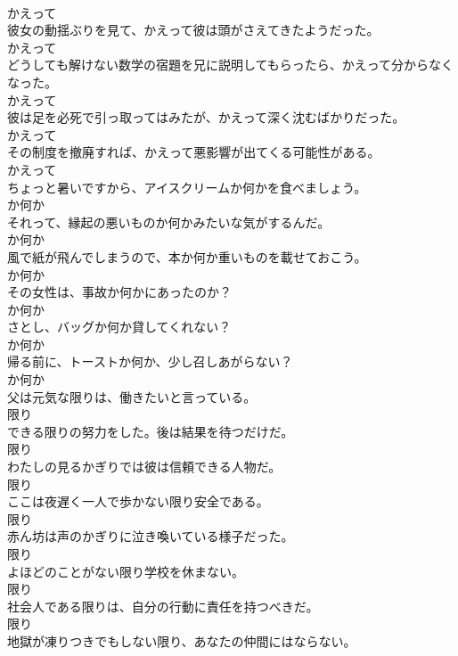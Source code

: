 \documentclass[8pt]{extreport}
\begin{document}
\begin{CJK}{UTF8}{min}
\\	かえって
\\	彼女の動揺ぶりを見て、かえって彼は頭がさえてきたようだった。	
\\	かえって
\\	どうしても解けない数学の宿題を兄に説明してもらったら、かえって分からなくなった。	
\\	かえって
\\	彼は足を必死で引っ取ってはみたが、かえって深く沈むばかりだった。	
\\	かえって
\\	その制度を撤廃すれば、かえって悪影響が出てくる可能性がある。	
\\	かえって
\\	ちょっと暑いですから、アイスクリームか何かを食べましょう。	
\\	か何か
\\	それって、縁起の悪いものか何かみたいな気がするんだ。	
\\	か何か
\\	風で紙が飛んでしまうので、本か何か重いものを載せておこう。	
\\	か何か
\\	その女性は、事故か何かにあったのか？	
\\	か何か
\\	さとし、バッグか何か貸してくれない？	
\\	か何か
\\	帰る前に、トーストか何か、少し召しあがらない？	
\\	か何か
\\	父は元気な限りは、働きたいと言っている。	
\\	限り
\\	できる限りの努力をした。後は結果を待つだけだ。	
\\	限り
\\	わたしの見るかぎりでは彼は信頼できる人物だ。	
\\	限り
\\	ここは夜遅く一人で歩かない限り安全である。	
\\	限り
\\	赤ん坊は声のかぎりに泣き喚いている様子だった。	
\\	限り
\\	よほどのことがない限り学校を休まない。	
\\	限り
\\	社会人である限りは、自分の行動に責任を持つべきだ。	
\\	限り
\\	地獄が凍りつきでもしない限り、あなたの仲間にはならない。	

\end{CJK}
\end{document}
